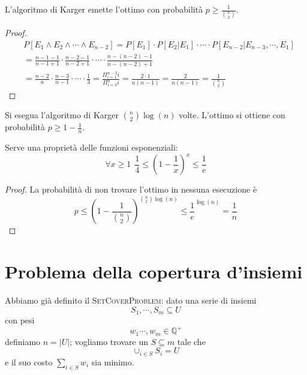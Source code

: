\begin{theorem}
	L'algoritmo di Karger emette l'ottimo con probabilità $p \geq \frac{1}{{n\choose{2}}}$.
\end{theorem}
\begin{proof}
	\begin{align*}
		 & P[E_1 \land E_2 \land \cdots \land E_{n-2}] = P[E_1] \cdot P[E_2|E_1] \cdot \cdots \cdot P[E_{n-2}| E_{n-3}, \cdots, E_1]                                                                       \\
		 & = \frac{n-1-1}{n-1+1} \cdot \frac{n - 2 - 1}{n - 2  +1}\cdot \cdots \cdot \frac{n - (n-2) -1}{n - (n-2) +1}                                                                                     \\
		 & = \frac{n-2}{n} \cdot \frac{n-3}{n-1} \cdot \cdots \cdot \frac{1}{3} = \frac{\Pi_{i = 1}^{n -2} i}{\Pi_{i = 3}^{n} i} = \frac{2 \cdot 1}{n (n-1)} = \frac{2}{n (n-1)} = \frac{1}{{n\choose{2}}}
	\end{align*}
\end{proof}

\begin{oss}
	Si esegua l'algoritmo di Karger ${n\choose{2}} \log(n)$ volte.
	L'ottimo si ottiene con probabilità $p \geq 1 - \frac{1}{n}$.
\end{oss}
Serve una proprietà delle funzioni esponenziali:
$$
	\forall x \geq 1 ~~ \frac{1}{4} \leq ( 1 - \frac{1}{x})^x \leq \frac{1}{e}
$$

\begin{proof}
	La probabilità di non trovare l'ottimo in nessuna esecuzione è
	$$
		p \leq (1 - \frac{1}{{n \choose 2}})^{{n \choose 2} \log (n)} \leq \frac{1}{e}^{\log(n)} = \frac{1}{n}
	$$
\end{proof}

\section{Problema della copertura d'insiemi}
Abbiamo già definito il \textsc{SetCoverProblem}:
dato una serie di insiemi
$$
	S_1, \cdots, S_m \subseteq U
$$
con pesi
$$
	w_1 \cdots, w_m \in \mathbb{Q}^+
$$
definiamo $n = |U|$; vogliamo trovare un $S \subseteq m$ tale che
$$
	\cup_{i \in S} S_i = U
$$
e il suo costo $ \sum_{i \in S} w_i$ sia minimo.


